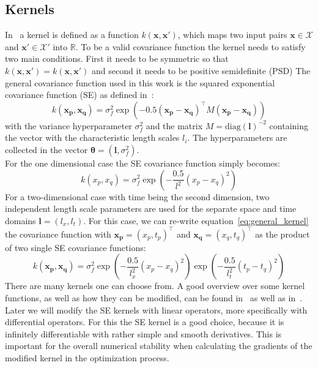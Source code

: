 \documentclass{article}
\begin{document}
\subsection{Kernels} \label{subsec: Kernels}
In~\cite{RasmussenCarlEdward} a kernel is defined as a function
$k(\bm{x},\bm{x'})$, which maps two input pairs $\bm{x} \in \mathcal{X}$ and
$\bm{x'} \in \mathcal{X'}$ into $\mathbb{R}$. To be a valid covariance function
the kernel needs to satisfy two main conditions. First it needs to be symmetric
so that $k(\bm{x,x'}) = k(\bm{x,x'})$ and second it needs to be positive
semidefinite (PSD) The general covariance function used in this work is the
squared exponential covariance function (SE) as defined
in~\cite{RasmussenCarlEdward}:
\begin{equation}
    k(\bm{x_p}, \bm{x_q}) = \sigma_f^2  \exp({-0.5{(\bm{x_p}-\bm{x_q} )}^\intercal M (\bm{x_p}- \bm{x_q})})
\end{equation}
with the variance hyperparameter $\sigma_f^2$ and the matrix $M = {\mathrm{diag}(\bm{l})}^{-2}$ containing the vector with the characteristic length scales $l_i$. The hyperparameters are collected in the vector $\bm{\theta} = (\bm{l},\sigma_f^2)$. \\
For the one dimensional case the SE covariance function simply becomes:
\begin{equation}
    k(x_p, x_q) = \sigma_f^2  \exp\left({-\frac{0.5}{l^2} {(x_p-x_q)}^2}\right)
\end{equation}
For a two-dimensional case with time being the second dimension, two independent length scale parameters are used for the separate space and time domains $\bm{l} = (l_x,l_t)$. For this case, we can re-write equation~\ref{eq:general_kernel} the covariance function with $\bm{x_p} = {(x_p, t_p)}^\intercal$ and  $\bm{x_q} = {(x_q, t_q)}^\intercal$ as the product of two single SE covariance functions:
\begin{equation}
    k(\bm{x_p}, \bm{x_q}) = \sigma_f^2  \exp\left({-\frac{0.5}{l_x^2} {(x_p-x_q)}^2}\right) \exp\left({-\frac{0.5}{l_t^2} {(t_p-t_q)}^2}\right)
\end{equation}
There are many kernels one can choose from. A good overview over some kernel functions, as well as how they can be modified, can be found in~\cite{Duvenaud} as well as in~\cite{görtler2019a}. Later we will modify the SE kernels with linear operators, more specifically with differential operators. For this the SE kernel is a good choice, because it is infinitely differentiable with rather simple and smooth derivatives. This is important for the overall numerical stability when calculating the gradients of the modified kernel in the optimization process.\\ 
\end{document}
